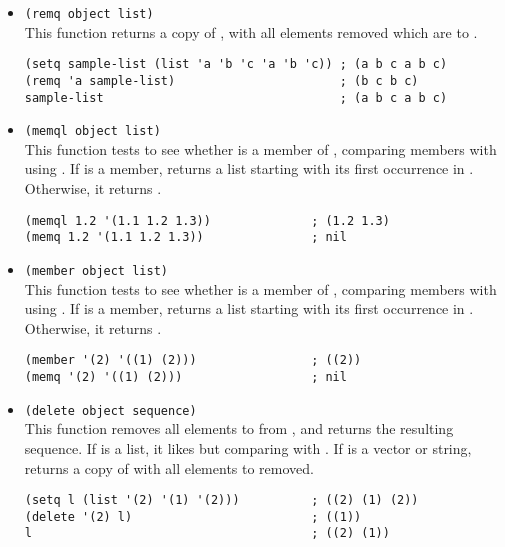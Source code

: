 \begin{itemize}
\begin{lstlisting}
(setq sample-list (list 'a 'b 'c '(4))) ; (a b c (4))
(delq 'a sample-list)                   ; (b c (4))
sample-list                             ; (a b c (4))
(delq 'c sample-list)                   ; (a b (4))
sample-list                             ; (a b (4))
\end{lstlisting}
\item \lstinline|(remq object list)|\\
  This function returns a copy of , with all elements removed which are  to .
\begin{lstlisting}
(setq sample-list (list 'a 'b 'c 'a 'b 'c)) ; (a b c a b c)
(remq 'a sample-list)                       ; (b c b c)
sample-list                                 ; (a b c a b c)
\end{lstlisting}
\item \lstinline|(memql object list)|\\
  This function tests to see whether  is a member of , comparing members with  using .
  If  is a member,  returns a list starting with its first occurrence in .
  Otherwise, it returns .
\begin{lstlisting}
(memql 1.2 '(1.1 1.2 1.3))              ; (1.2 1.3)
(memq 1.2 '(1.1 1.2 1.3))               ; nil
\end{lstlisting}
\item \lstinline|(member object list)|\\
  This function tests to see whether  is a member of , comparing members with  using .
  If  is a member,  returns a list starting with its first occurrence in .
  Otherwise, it returns .
\begin{lstlisting}
(member '(2) '((1) (2)))                ; ((2))
(memq '(2) '((1) (2)))                  ; nil
\end{lstlisting}
\item \lstinline|(delete object sequence)|\\
  This function removes all elements  to  from , and returns the resulting sequence.
  If  is a list, it  likes  but comparing with .
  If  is a vector or string,  returns a copy of  with all elements  to  removed.
\begin{lstlisting}
(setq l (list '(2) '(1) '(2)))          ; ((2) (1) (2))
(delete '(2) l)                         ; ((1))
l                                       ; ((2) (1))


\end{lstlisting}
\end{itemize}
